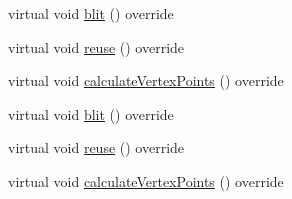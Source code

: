 \textbf{ }\par
\begin{DoxyCompactItemize}
\item 
virtual void \hyperlink{classTiledGrid3D_a0c3897a09f8eba5111ec263accdc4ce6}{blit} () override
\item 
virtual void \hyperlink{classTiledGrid3D_a5eb814b2be0d828068c1a3ae68744049}{reuse} () override
\item 
virtual void \hyperlink{classTiledGrid3D_a852fcee20d027566f129e9707b7f4a62}{calculate\+Vertex\+Points} () override
\end{DoxyCompactItemize}

\textbf{ }\par
\begin{DoxyCompactItemize}
\item 
virtual void \hyperlink{classTiledGrid3D_af7e3ffa4032b6aba3f5e177cd0c24459}{blit} () override
\item 
virtual void \hyperlink{classTiledGrid3D_a5c415f064b5c2364ff8e27f33784db08}{reuse} () override
\item 
virtual void \hyperlink{classTiledGrid3D_a0ae62db952e86b1f609e0ab3665947ca}{calculate\+Vertex\+Points} () override
\end{DoxyCompactItemize}

